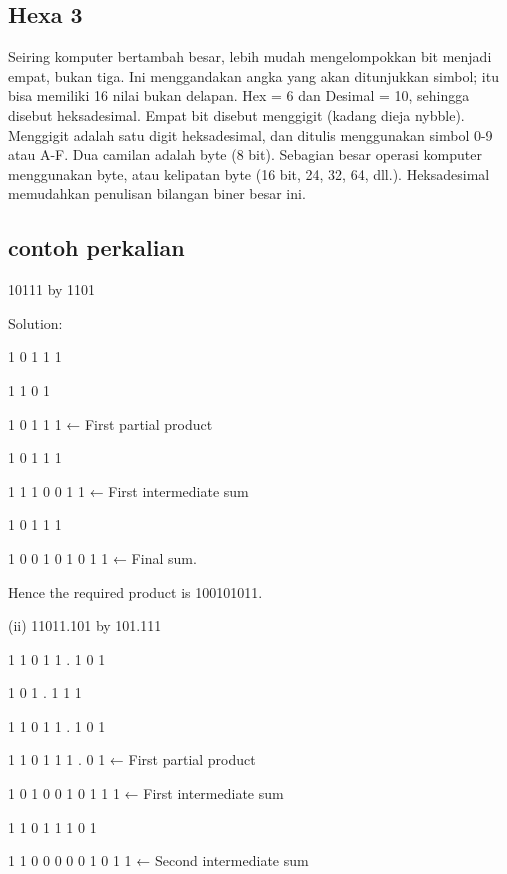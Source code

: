 {\subsection{Hexa 3}
Seiring komputer bertambah besar, lebih mudah mengelompokkan bit menjadi empat, bukan tiga. Ini menggandakan 
angka yang akan ditunjukkan simbol; itu bisa memiliki 16 nilai bukan delapan. Hex = 6 dan Desimal = 10, sehingga 
disebut heksadesimal. Empat bit disebut menggigit (kadang dieja nybble). Menggigit adalah satu digit heksadesimal, 
dan ditulis menggunakan simbol 0-9 atau A-F. Dua camilan adalah byte (8 bit). Sebagian besar operasi komputer 
menggunakan byte, atau kelipatan byte (16 bit, 24, 32, 64, dll.). Heksadesimal memudahkan penulisan bilangan biner besar ini.


\subsection{contoh perkalian}
10111 by 1101

Solution:

                                1 0 1 1 1

                                   1 1 0 1

                                 1 0 1 1 1           ← First partial product

                            1 0 1 1 1     

                            1 1 1 0 0 1 1           ← First intermediate sum

                         1 0 1 1 1          

                       1 0 0 1 0 1 0 1 1           ← Final sum.

Hence the required product is 100101011.


(ii) 11011.101 by 101.111

                                        1 1 0 1 1 . 1 0 1

                                             1 0 1 . 1 1 1  

                                        1 1 0 1 1 . 1 0 1

                                     1 1 0 1 1 1 . 0 1          ← First partial product

                                  1 0 1 0 0 1 0   1 1 1        ← First intermediate sum

                                  1 1 0 1 1 1 0   1        

                               1 1 0 0 0 0 0 1   0 1 1    ← Second intermediate sum

}
